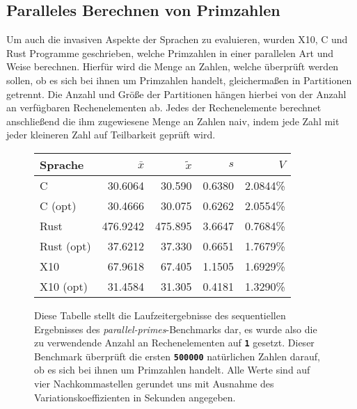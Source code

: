 \subsection{Paralleles Berechnen von Primzahlen}

Um auch die invasiven Aspekte der Sprachen zu evaluieren, wurden X10, C und Rust Programme geschrieben,
welche Primzahlen in einer parallelen Art und Weise berechnen.
Hierfür wird die Menge an Zahlen, welche überprüft werden sollen,
ob es sich bei ihnen um Primzahlen handelt, gleichermaßen in Partitionen getrennt.
Die Anzahl und Größe der Partitionen hängen hierbei von der Anzahl an verfügbaren Rechenelementen ab.
Jedes der Rechenelemente berechnet anschließend die ihm zugewiesene Menge an Zahlen naiv,
indem jede Zahl mit jeder kleineren Zahl auf Teilbarkeit geprüft wird.

\begin{figure}[hb]
	\begin{center}
		\begin{tabular}{lrrrr}
			\toprule
			Sprache & $\bar{x}$ & $\tilde{x}$ & $s$ & $V$ \\
			\midrule
			C          &  30.6064 &  30.590 & 0.6380 & 2.0844\% \\
			C (opt)    &  30.4666 &  30.075 & 0.6262 & 2.0554\% \\
			Rust       & 476.9242 & 475.895 & 3.6647 & 0.7684\% \\
			Rust (opt) &  37.6212 &  37.330 & 0.6651 & 1.7679\% \\
			X10        &  67.9618 &  67.405 & 1.1505 & 1.6929\% \\
			X10 (opt)  &  31.4584 &  31.305 & 0.4181 & 1.3290\% \\
			\bottomrule
		\end{tabular}
	\end{center}
	\caption{
		Diese Tabelle stellt die Laufzeitergebnisse des sequentiellen Ergebnisses des
		\textit{parallel-primes}-Benchmarks dar,
		es wurde also die zu verwendende Anzahl an Rechenelementen auf \texttt{\textsc{\textbf{1}}} gesetzt.
		Dieser Benchmark überprüft die ersten \texttt{\textsc{\textbf{500000}}} natürlichen Zahlen darauf,
		ob es sich bei ihnen um Primzahlen handelt.
		Alle Werte sind auf vier Nachkommastellen gerundet uns mit Ausnahme des Variationskoeffizienten
		in Sekunden angegeben.
	}
	\label{fig:primes_parallel_one_table}
\end{figure}

